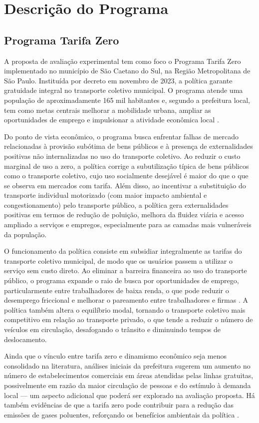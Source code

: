 
\section{Descrição do Programa}

\subsection{Programa Tarifa Zero}
A proposta de avaliação experimental tem como foco o Programa Tarifa Zero implementado no município de São Caetano do Sul, na Região Metropolitana de São Paulo. Instituída por decreto em novembro de 2023, a política garante gratuidade integral no transporte coletivo municipal. O programa atende uma população de aproximadamente 165 mil habitantes e, segundo a prefeitura local, tem como metas centrais melhorar a mobilidade urbana, ampliar as oportunidades de emprego e impulsionar a atividade econômica local \cite{PREF_SCS}.

Do ponto de vista econômico, o programa busca enfrentar falhas de mercado relacionadas à provisão subótima de bens públicos e à presença de externalidades positivas não internalizadas no uso do transporte coletivo. Ao reduzir o custo marginal de uso a zero, a política corrige a subutilização típica de bens públicos como o transporte coletivo, cujo uso socialmente desejável é maior do que o que se observa em mercados com tarifa. Além disso, ao incentivar a substituição do transporte individual motorizado (com maior impacto ambiental e congestionamento) pelo transporte público, a política gera externalidades positivas em termos de redução de poluição, melhora da fluidez viária e acesso ampliado a serviços e empregos, especialmente para as camadas mais vulneráveis da população.

O funcionamento da política consiste em subsidiar integralmente as tarifas do transporte coletivo municipal, de modo que os usuários passem a utilizar o serviço sem custo direto. Ao eliminar a barreira financeira ao uso do transporte público, o programa expande o raio de busca por oportunidades de emprego, particularmente entre trabalhadores de baixa renda, o que pode reduzir o desemprego friccional e melhorar o pareamento entre trabalhadores e firmas \cite{BETTER_FIRMS, NO_DAM}. A política também altera o equilíbrio modal, tornando o transporte coletivo mais competitivo em relação ao transporte privado, o que tende a reduzir o número de veículos em circulação, desafogando o trânsito e diminuindo tempos de deslocamento.

Ainda que o vínculo entre tarifa zero e dinamismo econômico seja menos consolidado na literatura, análises iniciais da prefeitura sugerem um aumento no número de estabelecimentos comerciais em áreas atendidas pelas linhas gratuitas, possivelmente em razão da maior circulação de pessoas e do estímulo à demanda local \cite{PREF_2024} — um aspecto adicional que poderá ser explorado na avaliação proposta. Há também evidências de que a tarifa zero pode contribuir para a redução das emissões de gases poluentes, reforçando os benefícios ambientais da política \cite{NO_DAM}.

